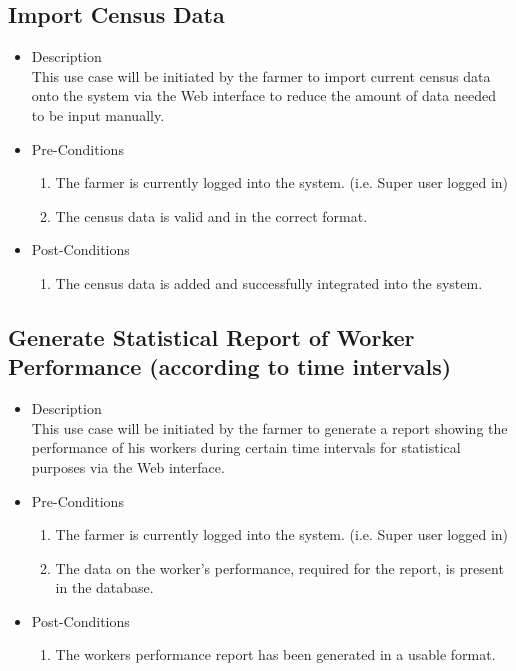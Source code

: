 \documentclass[11pt,fleqn]{book} %
\begin{document}
	\subsection{Import Census Data}
	\begin{itemize}
		\item Description\\
		This use case will be initiated by the farmer to import current census data onto the system via the Web interface to reduce the amount of data needed to be input manually.
		\item Pre-Conditions
		\begin{enumerate}
			\item The farmer is currently logged into the system. (i.e. Super user logged in)
			\item The census data is valid and in the correct format.								
		\end{enumerate}
		\item Post-Conditions
		\begin{enumerate}
			\item The census data is added and successfully integrated into the system.
		\end{enumerate}
	\end{itemize}
	
	\subsection{Generate Statistical Report of Worker Performance (according to time intervals)}
	\begin{itemize}
		\item Description\\
		This use case will be initiated by the farmer to generate a report showing the performance of his workers during certain time intervals for statistical purposes via the Web interface.
		\item Pre-Conditions
		\begin{enumerate}
			\item The farmer is currently logged into the system. (i.e. Super user logged in)
			\item The data on the worker’s performance, required for the report, is present in the database.		
		\end{enumerate}
		\item Post-Conditions
		\begin{enumerate}
			\item The workers performance report has been generated in a usable format.
		\end{enumerate}
	\end{itemize}
	
\end{document}
